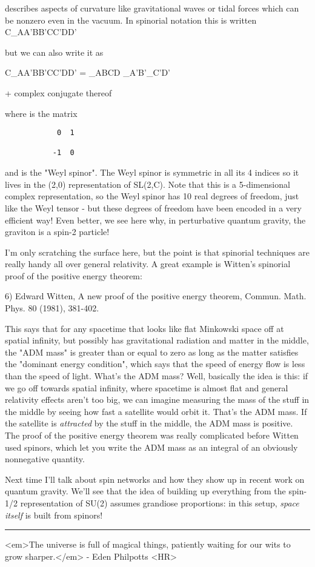 describes aspects of curvature like gravitational waves or tidal forces
which can be nonzero even in the vacuum.  In spinorial notation this is
written 
C_{AA'BB'CC'DD'}

but we can also write it as

C_{AA'BB'CC'DD'}  =  \Phi _{ABCD} \epsilon _{A'B'}\epsilon _{C'D'}

                 + complex conjugate thereof
               
where \epsilon  is the matrix
\begin{verbatim}
            0  1

           -1  0
\end{verbatim}
    
and \Phi  is the "Weyl spinor".  The Weyl spinor is symmetric in all its 4
indices so it lives in the (2,0) representation of SL(2,C).  Note that 
this is a 5-dimensional complex representation, so the Weyl spinor has
10 real degrees of freedom, just like the Weyl tensor - but these 
degrees of freedom have been encoded in a very efficient way!  Even 
better, we see here why, in perturbative quantum gravity, the graviton 
is a spin-2 particle!

I'm only scratching the surface here, but the point is that spinorial
techniques are really handy all over general relativity.  A great
example is Witten's spinorial proof of the positive energy theorem:

6) Edward Witten, A new proof of the positive energy theorem,
Commun. Math. Phys. 80 (1981), 381-402. 

This says that for any spacetime that looks like flat Minkowski space
off at spatial infinity, but possibly has gravitational radiation and
matter in the middle, the "ADM mass" is greater than or equal to zero as
long as the matter satisfies the "dominant energy condition", which says
that the speed of energy flow is less than the speed of light.  What's
the ADM mass?  Well, basically the idea is this: if we go off towards
spatial infinity, where spacetime is almost flat and general relativity
effects aren't too big, we can imagine measuring the mass of the stuff
in the middle by seeing how fast a satellite would orbit it.  That's the
ADM mass.  If the satellite is \emph{attracted} by the stuff in the middle,
the ADM mass is positive.  The proof of the positive energy theorem was
really complicated before Witten used spinors, which let you write the
ADM mass as an integral of an obviously nonnegative quantity.

Next time I'll talk about spin networks and how they show up in recent
work on quantum gravity.  We'll see that the idea of building up everything
from the spin-1/2 representation of SU(2) assumes grandiose proportions:
in this setup, \emph{space itself} is built from spinors!







\par\noindent\rule{\textwidth}{0.4pt}
<em>The universe is full of
magical things, patiently waiting for our wits to grow sharper.</em> - Eden Philpotts 
<HR>



